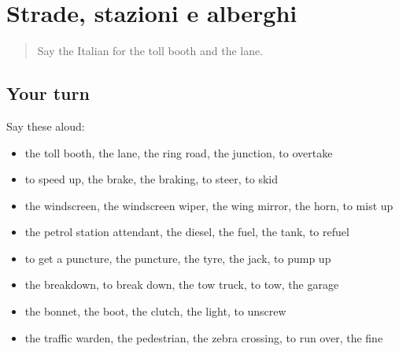 \section[(dialogue)]{Strade, stazioni e alberghi}

\label{lesson:IT-R412-ripasso-405-412}



\begin{quote}
Say the Italian for the toll booth and the lane.
\end{quote}

\subsection*{Your turn}
Say these aloud:

\begin{itemize}
\raggedright
  \item the toll booth, the lane, the ring road, the junction, to overtake
  \item to speed up, the brake, the braking, to steer, to skid
  \item the windscreen, the windscreen wiper, the wing mirror, the horn, to mist up
  \item the petrol station attendant, the diesel, the fuel, the tank, to refuel
  \item to get a puncture, the puncture, the tyre, the jack, to pump up
  \item the breakdown, to break down, the tow truck, to tow, the garage
  \item the bonnet, the boot, the clutch, the light, to unscrew
  \item the traffic warden, the pedestrian, the zebra crossing, to run over, the fine
\end{itemize}

